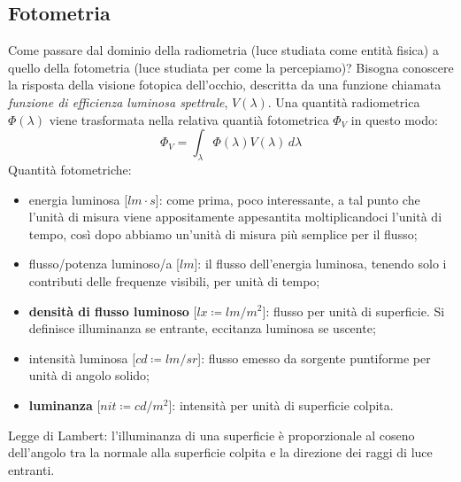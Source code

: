 \documentclass[a4paper,11pt]{article}
\begin{document}
\subsection{Fotometria}
Come passare dal dominio della radiometria (luce studiata come entità fisica) a quello della fotometria (luce studiata per come la percepiamo)?
Bisogna conoscere la risposta della visione fotopica dell'occhio, descritta da una funzione chiamata
\textit{funzione di efficienza luminosa spettrale}, $V(\lambda)$.
Una quantità radiometrica $\Phi(\lambda)$ viene trasformata nella relativa quantià fotometrica $\Phi_V$ in questo modo:
\[\Phi_V = \int_\lambda \Phi(\lambda) V(\lambda) \,d\lambda \]
Quantità fotometriche:
\begin{itemize}
    \item energia luminosa [$lm \cdot s$]: come prima, poco interessante, a tal punto che l'unità di misura viene appositamente appesantita moltiplicandoci l'unità di tempo, così dopo abbiamo un'unità
    di misura più semplice per il flusso;
    \item flusso/potenza luminoso/a [$lm$]: il flusso dell'energia luminosa, tenendo solo i contributi delle frequenze visibili, per unità di tempo;
    \item \textbf{densità di flusso luminoso} [$lx \coloneqq lm / m^2$]: flusso per unità di superficie. Si definisce illuminanza se entrante, eccitanza luminosa se uscente;
    \item intensità luminosa [$cd \coloneqq lm / sr$]: flusso emesso da sorgente puntiforme per unità di angolo solido;
    \item \textbf{luminanza} [$nit \coloneqq cd / m^2$]: intensità per unità di superficie colpita.
\end{itemize}

Legge di Lambert: l'illuminanza di una superficie è proporzionale al coseno dell'angolo tra la normale alla superficie colpita e la direzione dei raggi di luce entranti.
\end{document}
